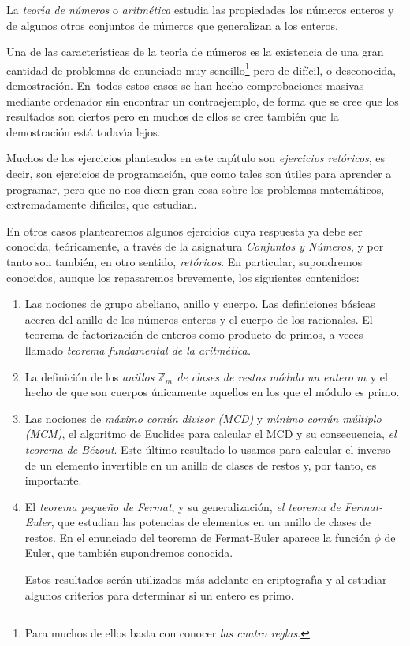 La {\itshape teor\'{\i}a de n\'umeros} o {\itshape aritm\'etica} estudia las
propiedades los n\'umeros enteros y  de algunos otros conjuntos de n\'umeros
que generalizan a los enteros. 

Una de las caracter\'{\i}sticas de la teor\'{\i}a de n\'umeros es la existencia
de una gran cantidad de {\sc problemas de enunciado muy sencillo\footnote{Para
muchos
de ellos basta con conocer {\itshape las cuatro reglas}.}
pero de difícil, o desconocida, demostración}.
En~todos estos casos se han hecho comprobaciones masivas mediante ordenador  sin
encontrar un contraejemplo, de forma que se cree que los resultados son ciertos
pero en muchos de ellos se cree tambi\'en que la demostraci\'on est\'a
todav\'{\i}a lejos.


Muchos de los ejercicios planteados en este cap\'{\i}tulo son
{\itshape ejercicios ret\'oricos}, es decir, son ejercicios de programaci\'on,
que como tales son \'utiles para aprender a programar, pero que no nos dicen
gran cosa sobre los problemas matem\'aticos, extremadamente dif\'{\i}ciles, que
estudian. 


En otros casos plantearemos algunos ejercicios cuya respuesta ya debe ser
conocida, te\'oricamente, a trav\'es de 
la asignatura {\itshape Conjuntos y
N\'umeros}, y por tanto son tambi\'en, en otro sentido, {\itshape ret\'oricos}.
En particular,  supondremos conocidos, aunque los repasaremos brevemente,  los siguientes contenidos:

\begin{enumerate}
 \item Las nociones de grupo abeliano, anillo y cuerpo. Las definiciones
b\'asicas acerca del anillo de los n\'umeros enteros y el cuerpo de los
racionales. El teorema de factorizaci\'on de enteros como producto de primos, a
veces llamado {\itshape teorema fundamental de la aritm\'etica.} 
 
 \item La definici\'on de los {\itshape anillos $\mathbb{Z}_m$ de clases de
restos m\'odulo un entero $m$} y el hecho de que son cuerpos \'unicamente
aquellos en los que
el m\'odulo es primo. 

\item Las nociones de {\itshape m\'aximo com\'un divisor (MCD)} y {\itshape
m\'{\i}nimo com\'un m\'ultiplo (MCM)}, el algoritmo de Euclides para calcular el
MCD y su consecuencia, {\itshape el teorema de Bézout}. Este \'ultimo resultado
lo usamos para calcular el inverso de un elemento invertible en un anillo de
clases de restos y, por tanto,  es importante.

\item El {\itshape teorema peque\~no de Fermat}, y su generalizaci\'on,
{\itshape el teorema de Fermat-Euler},  que estudian las potencias de elementos
en un anillo de clases de restos. En el enunciado del teorema de Fermat-Euler
aparece la funci\'on $\phi$ de Euler, que tambi\'en supondremos conocida.


Estos resultados ser\'an utilizados m\'as
adelante en criptograf\'{\i}a y al estudiar algunos criterios para determinar si
un entero es primo.
 
\end{enumerate}

